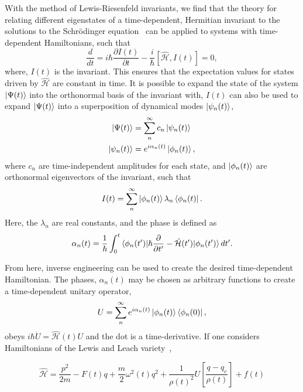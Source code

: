 With the method of Lewis-Riesenfeld invariants, we find that the theory for relating different eigenstates of a time-dependent, Hermitian invariant to the solutions to the Schr\"odinger equation~\cite{lewis1969} can be applied to systems with time-dependent Hamiltonians, such that
\begin{equation}
\frac{d}{dt} = i\hbar \frac{\partial I(t)}{\partial t} - \frac{i}{\hbar}\left[\mathcal{\hat H},I(t)\right] = 0,
\end{equation}
\noindent where, $I(t)$ is the invariant.
This ensures that the expectation values for states driven by $\mathcal{\hat H}$ are constant in time.
It is possible to expand the state of the system $\ket{\Psi(t)}$ into the orthonormal basis of the invariant with,
$I(t)$ can also be used to expand $\ket{\Psi(t)}$ into a superposition of dynamical modes $\ket{\psi_n(t)}$,
\begin{align}
\ket{\Psi(t)} &=\sum_n^\infty c_n \ket{\psi_n(t)} \\
\ket{\psi_n(t)} &= e^{i\alpha_n(t)}\ket{\phi_n(t)},
\end{align}
\noindent where $c_n$ are time-independent amplitudes for each state, and $\ket{\phi_n(t)}$ are orthonormal eigenvectors of the invariant, such that
\begin{equation}
I(t) = \sum_n^\infty\ket{\phi_n(t)}\lambda_n\bra{\phi_n(t)}.
\end{equation}
\noindent Here, the $\lambda_n$ are real constants, and the phase is defined as ~\cite{lewis1969}
\begin{equation}
\alpha_n(t) = \frac{1}{\hbar}\int_0^t\braket{\phi_n(t')|\hbar\frac{\partial}{\partial t'} - \mathcal{\hat H}(t')|\phi_n(t')}dt'.
\end{equation}

From here, inverse engineering can be used to create the desired time-dependent Hamiltonian.
The phases, $\alpha_n(t)$ may be chosen as arbitrary functions to create a time-dependent unitary operator,
\begin{equation}
U = \sum_n^\infty e^{i\alpha_n(t)}\ket{\phi_n(t)}\bra{\phi_n(0)},
\end{equation}
\noindent obeys $i\hbar \dot U = \mathcal{\hat H}(t)U$ and the dot is a time-derivative.
If one considers Hamiltonians of the Lewis and Leach variety~\cite{lewis1982},

\begin{equation}
\mathcal{\hat H} = \frac{p^2}{2m}  -F(t)q + \frac{m}{2}\omega^2(t)q^2 + \frac{1}{\rho(t)^2}U\left[\frac{q-q_c}{\rho(t)}\right] + f(t)
\label{eqn:HSTA}
\end{equation}

